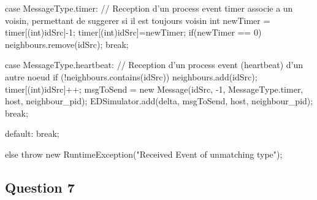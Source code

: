 \documentclass[10pt]{report}
\begin{document}
\begin{boxedlisting}
{{{{			case MessageType.timer:
				// Reception d'un process event timer associe a un voisin, permettant de suggerer si il est toujours voisin
				int newTimer = timer[(int)idSrc]-1; 
				timer[(int)idSrc]=newTimer;
				if(newTimer == 0) 
					neighbours.remove(idSrc);
				break;
				
			case MessageType.heartbeat:
				// Reception d'un process event (heartbeat) d'un autre noeud
				if (!neighbours.contains(idSrc)) {
					neighbours.add(idSrc);
				}
				timer[(int)idSrc]++;
				msgToSend = new Message(idSrc, -1, MessageType.timer, host, neighbour_pid);
				EDSimulator.add(delta, msgToSend, host, neighbour_pid);
				break;
			
			default:
				break;
			}
		} else {
			throw new RuntimeException("Received Event of unmatching type");
		}
	}
}

\end{boxedlisting}

\subsection{Question 7}
\end{document}
